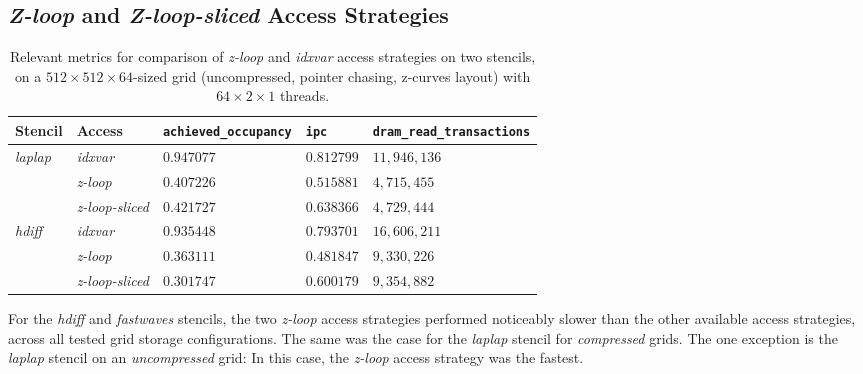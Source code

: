 



\subsection{\emph{Z-loop} and \emph{Z-loop-sliced} Access Strategies}

\begin{table}
	\begin{center}
    \begin{tabular}{l l p{2.5cm} p{2.5cm} p{2.5cm}}
        \hline
        \textbf{Stencil} & \textbf{Access} & \textbf{\texttt{achieved\_\allowbreak occupancy}} & \textbf{\texttt{ipc}} & \textbf{\texttt{dram\_\allowbreak read\_\allowbreak transactions}} \\
        \hline
        \hline
        \emph{laplap} & \emph{idxvar} & $0.947077$ & $0.812799$ & $11,946,136$ \\
        & \emph{z-loop} & $0.407226$ & $0.515881$ & $4,715,455$ \\
        & \emph{z-loop-sliced} & $0.421727$ & $0.638366$ & $4,729,444$ \\
        \hline
        \emph{hdiff} & \emph{idxvar} & $0.935448$ & $0.793701$ & $16,606,211$ \\
        & \emph{z-loop} & $0.363111$ & $0.481847$ & $9,330,226$ \\
        & \emph{z-loop-sliced} & $0.301747$ & $0.600179$ & $9,354,882$ \\
        \hline
    \end{tabular}
	\end{center}
    \caption{\label{tab:access-z-loop} Relevant metrics for comparison of \emph{z-loop} and \emph{idxvar} access strategies on two stencils, on a $512\times 512\times 64$-sized grid (uncompressed, pointer chasing, z-curves layout) with $64\times 2\times 1$ threads.}
\end{table}

For the \emph{hdiff} and \emph{fastwaves} stencils, the two \emph{z-loop} access strategies performed noticeably slower than the other available access strategies, across all tested grid storage configurations. The same was the case for the \emph{laplap} stencil for \emph{compressed} grids. The one exception is the \emph{laplap} stencil on an \emph{uncompressed} grid: In this case, the \emph{z-loop} access strategy was the fastest.

